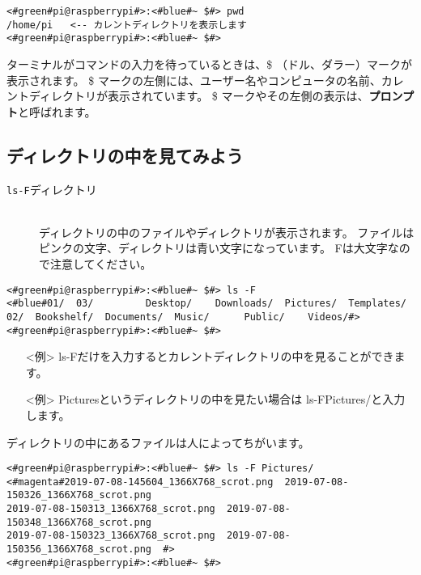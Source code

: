\begin{lstlisting}[caption=pwdコマンドの例,label=pwdtest]
<#green#pi@raspberrypi#>:<#blue#~ $#> pwd
/home/pi   <-- カレントディレクトリを表示します
<#green#pi@raspberrypi#>:<#blue#~ $#>
\end{lstlisting}

ターミナルがコマンドの入力を待っているときは、\$ （ドル、ダラー）マークが表示されます。
\$ マークの左側には、ユーザー名やコンピュータの名前、カレントディレクトリが表示されています。
\$ マークやその左側の表示は、{\bf プロンプト}と呼ばれます。

\subsection{ディレクトリの中を見てみよう}
\begin{description}
\item[\texttt{ls}\textvisiblespace \texttt{-F}\textvisiblespace ディレクトリ]\mbox{}\\
ディレクトリの中のファイルやディレクトリが表示されます。
ファイルはピンクの文字、ディレクトリは青い文字になっています。
Fは大文字なので注意してください。
\end{description}

\begin{minipage}{\linewidth}
\begin{lstlisting}[caption=ls -F コマンドの例。ファイルやディレクトリが表示されます,label=lsFtest]
<#green#pi@raspberrypi#>:<#blue#~ $#> ls -F
<#blue#01/  03/         Desktop/    Downloads/  Pictures/  Templates/
02/  Bookshelf/  Documents/  Music/      Public/    Videos/#>
<#green#pi@raspberrypi#>:<#blue#~ $#>
\end{lstlisting}
\end{minipage}

\begin{itemize}
\item[<例>] ls\textvisiblespace -Fだけを入力するとカレントディレクトリの中を見ることができます。 
\item[<例>] Picturesというディレクトリの中を見たい場合は ls\textvisiblespace -F\textvisiblespace Pictures/と入力します。 
\end{itemize}

ディレクトリの中にあるファイルは人によってちがいます。
\begin{lstlisting}[caption=ls -F Pictures/コマンドの例,label=lsFPicttest]
<#green#pi@raspberrypi#>:<#blue#~ $#> ls -F Pictures/
<#magenta#2019-07-08-145604_1366X768_scrot.png  2019-07-08-150326_1366X768_scrot.png  
2019-07-08-150313_1366X768_scrot.png  2019-07-08-150348_1366X768_scrot.png  
2019-07-08-150323_1366X768_scrot.png  2019-07-08-150356_1366X768_scrot.png  #>
<#green#pi@raspberrypi#>:<#blue#~ $#> 
\end{lstlisting}

